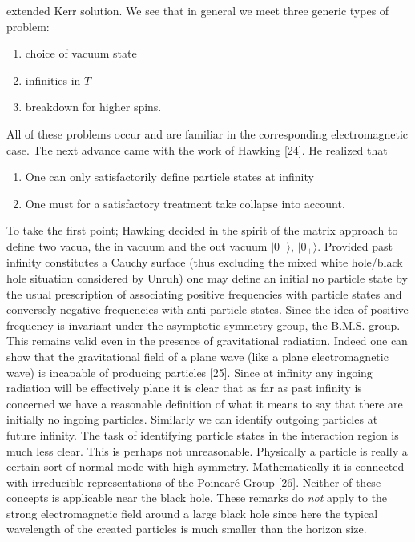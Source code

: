 extended Kerr solution. We see that in general we meet three generic types of problem:
\begin{enumerate}
\item choice of vacuum state
\item infinities in $T$
\item breakdown for higher spins.
\end{enumerate}
All of these problems occur and are familiar in the corresponding electromagnetic
case. The next advance came with the work of Hawking [24]. He realized that
\begin{enumerate}
\item One can only satisfactorily define particle states at infinity

\item One must for a satisfactory treatment take collapse
into account.
\end{enumerate}
To take the first point; Hawking decided in the spirit of the matrix
approach to define two vacua, the in vacuum and the out vacuum $\vert 0_{-} \rangle$, $\vert 0_+ \rangle$.
Provided past infinity constitutes a Cauchy surface (thus excluding the mixed white
hole/black hole situation considered by Unruh) one may define an initial no
particle state by the usual prescription of associating positive frequencies
with particle states and conversely negative frequencies with anti-particle states.
Since the idea of positive frequency is invariant under the asymptotic symmetry group, the B.M.S.
group. This remains valid even in the presence of gravitational radiation. 
Indeed one can show that the gravitational field of a plane wave (like a plane electromagnetic wave)
is incapable of producing particles [25]. Since at infinity any ingoing radiation will be effectively plane it is clear that as far
as past infinity is concerned we have a reasonable definition of what it means to
say that there are initially no ingoing particles. Similarly we can identify outgoing particles
at future infinity. The task of identifying particle states in the interaction region is much less clear.
This is perhaps not unreasonable. Physically a particle is really a certain sort
of normal mode with high symmetry. Mathematically it is connected with irreducible
representations of the Poincar\'e Group [26]. Neither of these concepts is applicable near the black hole.
These remarks do {\it not} apply to the strong electromagnetic field around a large black hole since
here the typical wavelength of the created particles is much smaller than the horizon size.

